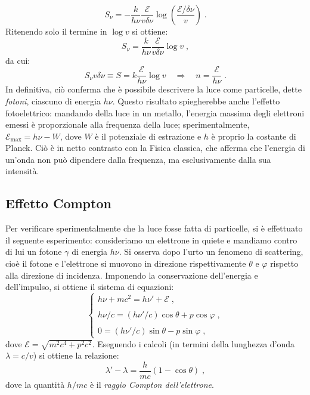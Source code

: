 \documentclass[12pt,a4paper]{report}
\theoremstyle{definition}
\numberwithin{equation}{section}
\begin{document}
$$
S_{\nu}=-\frac{k}{h\nu}\frac{\mathcal{E}}{v\delta\nu}\log\left(\frac{\mathcal{E}/\delta\nu}{v}\right)\;.
$$
Ritenendo solo il termine in $\log v$ si ottiene:
\begin{equation}
S_{\nu}=\frac{k}{h\nu}\frac{\mathcal{E}}{v\delta\nu}\log v\;,
\end{equation}
da cui:
\begin{equation}
S_{\nu}v\delta\nu\equiv S= k\frac{\mathcal{E}}{h\nu}\log v\quad  \Longrightarrow \quad n=\frac{\mathcal{E}}{h\nu}\;.
\end{equation}
In definitiva, ciò conferma che è possibile descrivere la luce come particelle, dette \textit{fotoni}, ciascuno di energia $h\nu$. Questo risultato spiegherebbe anche l'effetto fotoelettrico: mandando della luce in un metallo, l'energia massima degli elettroni emessi è proporzionale alla frequenza della luce; sperimentalmente, $\mathcal{E}_{\mathrm{max}}=h\nu-W$, dove $W$ è il potenziale di estrazione e $h$ è proprio la costante di Planck. Ciò è in netto contrasto con la Fisica classica, che afferma che l'energia di un'onda non può dipendere dalla frequenza, ma esclusivamente dalla sua intensità.
\subsection{Effetto Compton}
Per verificare sperimentalmente che la luce fosse fatta di particelle, si è effettuato il seguente esperimento: consideriamo un elettrone in quiete e mandiamo contro di lui un fotone $\gamma$ di energia $h\nu$. Si osserva dopo l'urto un fenomeno di scattering, cioè il fotone e l'elettrone si muovono in direzione rispettivamente $\theta$ e $\varphi$ rispetto alla direzione di incidenza. Imponendo la conservazione dell'energia e dell'impulso, si ottiene il sistema di equazioni:
$$
\begin{cases}
h\nu + mc^2=h\nu'+\mathcal{E}\;, \\
\\
h\nu/c=(h\nu'/c)\cos\theta+p\cos\varphi\;, \\
\\
0=(h\nu'/c)\sin\theta-p\sin\varphi\;,
\end{cases}
$$
dove $\mathcal{E}=\sqrt{m^2c^4+p^2c^2}$. Eseguendo i calcoli (in termini della lunghezza d'onda $\lambda=c/v$) si ottiene la relazione:
\begin{equation}
\lambda'-\lambda =\frac{h}{mc}(1-\cos\theta)\;,
\end{equation}
dove la quantità $h/mc$ è il \textit{raggio Compton dell'elettrone}.
\end{document}
